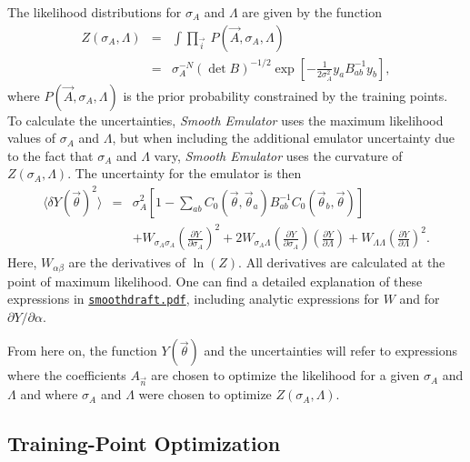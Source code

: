 \documentclass[UserManual.tex]{subfiles}
\begin{document}
The likelihood distributions for $\sigma_A$ and $\Lambda$ are given by the function
\begin{eqnarray}
Z(\sigma_A,\Lambda)&=&\int\prod_{\vec{i}}~P(\vec{A},\sigma_A,\Lambda)\\
\nonumber
&=&\sigma_A^{-N}(\det{B})^{-1/2}\exp\left[-\frac{1}{2\sigma_A^2}y_aB^{-1}_{ab}y_b\right],
\end{eqnarray}
where $P(\vec{A},\sigma_A,\Lambda)$ is the prior probability constrained by the training points. To calculate the uncertainties, {\it Smooth Emulator} uses the maximum likelihood values of $\sigma_A$ and $\Lambda$, but when including the additional emulator uncertainty due to the fact that $\sigma_A$ and $\Lambda$ vary, {\it Smooth Emulator} uses the curvature of $Z(\sigma_A,\Lambda)$.
The uncertainty for the emulator is then
\begin{eqnarray}\label{eq:delY2}
\langle\delta Y(\vec{\theta})^2\rangle&=&
\nonumber
\sigma_A^2\left[1-\sum_{ab}C_0(\vec{\theta},\vec{\theta}_a)B^{-1}_{ab}C_0(\vec{\theta}_b,\vec{\theta})\right]\\
\nonumber
&&+W_{\sigma_A\sigma_A}\left(\frac{\partial Y}{\partial\sigma_A}\right)^2
+2W_{\sigma_A\Lambda}\left(\frac{\partial Y}{\partial\sigma_A}\right)\left(\frac{\partial Y}{\partial\Lambda}\right)
+W_{\Lambda\Lambda}\left(\frac{\partial Y}{\partial\Lambda}\right)^2.
\end{eqnarray}
Here, $W_{\alpha\beta}$ are the derivatives of $\ln(Z)$. All derivatives are calculated at the point of maximum likelihood. One can find a detailed explanation of these expressions in \href{./smoothdraft.pdf}{{\tt smoothdraft.pdf}}, including analytic expressions for $W$ and for $\partial Y/\partial\alpha$.

From here on, the function $Y(\vec{\theta})$ and the uncertainties will refer to expressions where the coefficients $A_{\vec{n}}$ are chosen to optimize the likelihood for a given $\sigma_A$ and $\Lambda$ and where $\sigma_A$ and $\Lambda$ were chosen to optimize $Z(\sigma_A,\Lambda)$.

\subsection{Training-Point Optimization}
\end{document}
